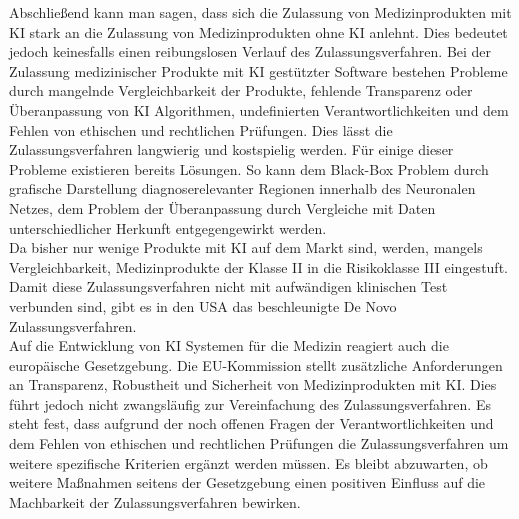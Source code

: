 Abschließend kann man sagen, dass sich die Zulassung von Medizinprodukten mit KI stark an die Zulassung von Medizinprodukten ohne KI anlehnt. Dies bedeutet jedoch keinesfalls einen reibungslosen Verlauf des Zulassungsverfahren. 
Bei der Zulassung medizinischer Produkte mit KI gestützter Software bestehen Probleme durch mangelnde Vergleichbarkeit der Produkte, fehlende Transparenz oder Überanpassung von KI Algorithmen, undefinierten Verantwortlichkeiten und dem Fehlen von ethischen und rechtlichen Prüfungen. Dies lässt die Zulassungsverfahren langwierig und kostspielig werden.
Für einige dieser Probleme existieren bereits Lösungen. So kann dem Black-Box Problem durch grafische Darstellung diagnoserelevanter Regionen innerhalb des Neuronalen Netzes, dem Problem der Überanpassung durch Vergleiche mit Daten unterschiedlicher Herkunft entgegengewirkt werden.\\ 
Da bisher nur wenige Produkte mit KI auf dem Markt sind, werden, mangels Vergleichbarkeit, Medizinprodukte der Klasse II in die Risikoklasse III eingestuft. Damit diese Zulassungsverfahren nicht mit aufwändigen klinischen Test verbunden sind, gibt es in den USA das beschleunigte De Novo Zulassungsverfahren.\\
Auf die Entwicklung von KI Systemen für die Medizin reagiert auch die europäische Gesetzgebung. Die EU-Kommission stellt zusätzliche Anforderungen an Transparenz, Robustheit und Sicherheit von Medizinprodukten mit KI. Dies führt jedoch nicht zwangsläufig zur Vereinfachung des Zulassungsverfahren. 
Es steht fest, dass aufgrund der noch offenen Fragen der  Verantwortlichkeiten und dem Fehlen von ethischen und rechtlichen Prüfungen die Zulassungsverfahren um weitere spezifische Kriterien ergänzt werden müssen. 
Es bleibt abzuwarten, ob weitere Maßnahmen seitens der Gesetzgebung einen positiven Einfluss auf die Machbarkeit der Zulassungsverfahren bewirken.


